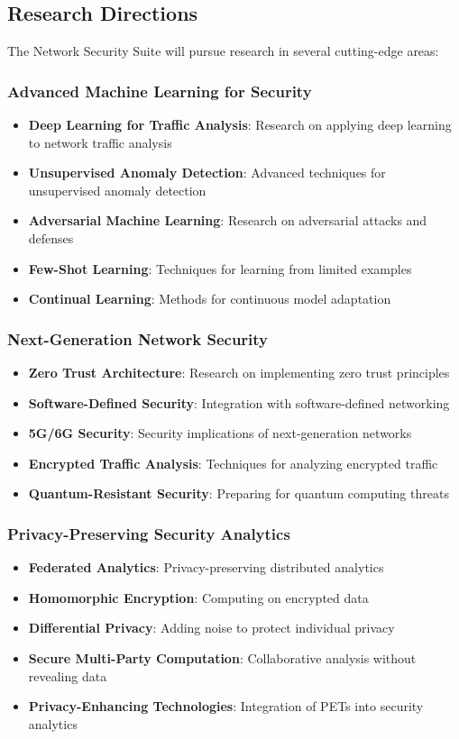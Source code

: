 \subsection{Research Directions}
The Network Security Suite will pursue research in several cutting-edge areas:

\subsubsection{Advanced Machine Learning for Security}
\begin{itemize}
    \item \textbf{Deep Learning for Traffic Analysis}: Research on applying deep learning to network traffic analysis
    \item \textbf{Unsupervised Anomaly Detection}: Advanced techniques for unsupervised anomaly detection
    \item \textbf{Adversarial Machine Learning}: Research on adversarial attacks and defenses
    \item \textbf{Few-Shot Learning}: Techniques for learning from limited examples
    \item \textbf{Continual Learning}: Methods for continuous model adaptation
\end{itemize}

\subsubsection{Next-Generation Network Security}
\begin{itemize}
    \item \textbf{Zero Trust Architecture}: Research on implementing zero trust principles
    \item \textbf{Software-Defined Security}: Integration with software-defined networking
    \item \textbf{5G/6G Security}: Security implications of next-generation networks
    \item \textbf{Encrypted Traffic Analysis}: Techniques for analyzing encrypted traffic
    \item \textbf{Quantum-Resistant Security}: Preparing for quantum computing threats
\end{itemize}

\subsubsection{Privacy-Preserving Security Analytics}
\begin{itemize}
    \item \textbf{Federated Analytics}: Privacy-preserving distributed analytics
    \item \textbf{Homomorphic Encryption}: Computing on encrypted data
    \item \textbf{Differential Privacy}: Adding noise to protect individual privacy
    \item \textbf{Secure Multi-Party Computation}: Collaborative analysis without revealing data
    \item \textbf{Privacy-Enhancing Technologies}: Integration of PETs into security analytics
\end{itemize}

